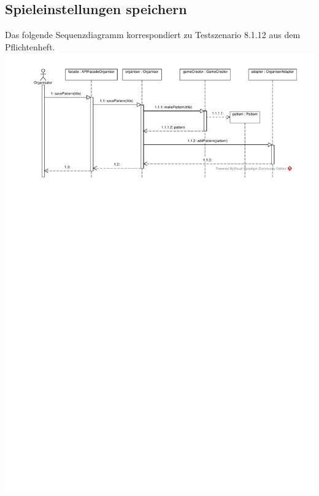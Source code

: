 \documentclass[a4paper]{scrreprt}
\begin{document}
	\subsection{Spieleinstellungen speichern}
	Das folgende Sequenzdiagramm korrespondiert zu Testszenario 8.1.12 aus dem Pflichtenheft. \\
	\includegraphics[width=\textwidth]{img/Spieleinstellungen_speichern.pdf}
\end{document}
